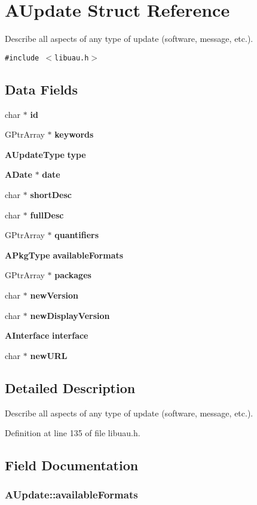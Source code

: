 \section{AUpdate Struct Reference}
\label{structAUpdate}
Describe all aspects of any type of update (software, message, etc.).  


{\tt \#include $<$libuau.h$>$}

\subsection*{Data Fields}
\begin{CompactItemize}
\item 
char $\ast$ {\bf id}
\item 
GPtr\-Array $\ast$ {\bf keywords}
\item 
{\bf AUpdate\-Type} {\bf type}
\item 
{\bf ADate} $\ast$ {\bf date}
\item 
char $\ast$ {\bf short\-Desc}
\item 
char $\ast$ {\bf full\-Desc}
\item 
GPtr\-Array $\ast$ {\bf quantifiers}
\item 
{\bf APkg\-Type} {\bf available\-Formats}
\item 
GPtr\-Array $\ast$ {\bf packages}
\item 
char $\ast$ {\bf new\-Version}
\item 
char $\ast$ {\bf new\-Display\-Version}
\item 
{\bf AInterface} {\bf interface}
\item 
char $\ast$ {\bf new\-URL}
\end{CompactItemize}


\subsection{Detailed Description}
Describe all aspects of any type of update (software, message, etc.). 



Definition at line 135 of file libuau.h.

\subsection{Field Documentation}
\subsubsection{ {\bf AUpdate::available\-Formats}}\label{structAUpdate_o7}


